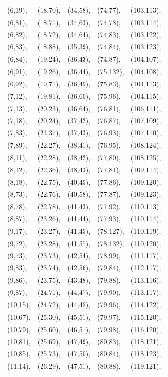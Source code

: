 \documentclass[twocolumn]{svjour3}
\begin{document}
\begin{center}
\begin{supertabular}[tb]{l l l l l}
(6,19),&(18,70),&(34,58),&(74,77),&(103,113),\\
(6,81),&(18,71),&(34,63),&(74,78),&(103,114),\\
(6,82),&(18,72),&(34,64),&(74,83),&(103,122),\\
(6,83),&(18,88),&(35,39),&(74,84),&(103,123),\\
(6,84),&(19,24),&(36,43),&(74,87),&(104,107),\\
(6,91),&(19,26),&(36,44),&(75,132),&(104,108),\\
(6,92),&(19,71),&(36,45),&(75,83),&(104,113),\\
(7,12),&(19,81),&(36,60),&(75,96),&(104,115),\\
(7,13),&(20,23),&(36,64),&(76,81),&(106,111),\\
(7,18),&(20,24),&(37,42),&(76,87),&(107,109),\\
(7,83),&(21,37),&(37,43),&(76,93),&(107,110),\\
(7,89),&(22,27),&(38,41),&(76,95),&(108,124),\\
(8,11),&(22,28),&(38,42),&(77,80),&(108,125),\\
(8,12),&(22,36),&(38,43),&(77,81),&(109,114),\\
(8,18),&(22,75),&(40,45),&(77,86),&(109,120),\\
(8,73),&(22,76),&(40,58),&(77,87),&(109,123),\\
(8,78),&(22,78),&(41,43),&(77,92),&(110,113),\\
(8,87),&(23,26),&(41,44),&(77,93),&(110,114),\\
(9,17),&(23,27),&(41,45),&(78,127),&(110,119),\\
(9,72),&(23,28),&(41,57),&(78,132),&(110,120),\\
(9,73),&(23,73),&(42,54),&(78,99),&(111,117),\\
(9,83),&(23,74),&(42,56),&(79,84),&(112,117),\\
(9,86),&(23,75),&(43,48),&(79,88),&(113,116),\\
(9,87),&(24,71),&(44,47),&(79,90),&(113,117),\\
(10,15),&(24,72),&(44,48),&(79,96),&(114,122),\\
(10,67),&(25,30),&(45,51),&(79,97),&(115,120),\\
(10,79),&(25,60),&(46,51),&(79,98),&(116,120),\\
(10,81),&(25,69),&(47,49),&(80,83),&(118,121),\\
(10,85),&(25,73),&(47,50),&(80,84),&(118,123),\\
(11,14),&(26,29),&(47,51),&(80,88),&(119,121),\\

\end{supertabular}
\end{center}
\end{document}
